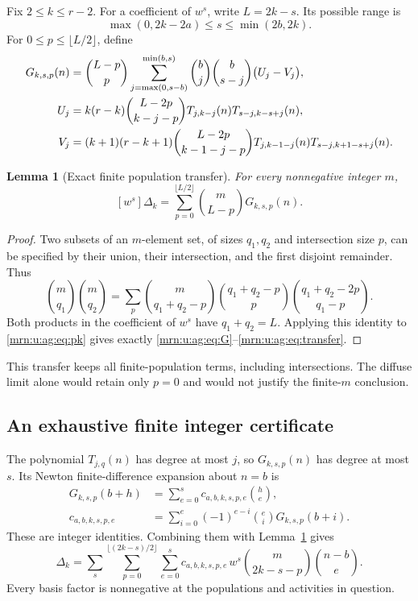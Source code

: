 \documentclass[11pt,a4paper]{article}
\newtheorem{lemma}[theorem]{Lemma}
\theoremstyle{remark}\newtheorem{remark}[theorem]{Remark}
\begin{document}
Fix $2\le k\le r-2$. For a coefficient of $w^s$, write $L=2k-s$. Its possible range is
\begin{equation}\label{mrn:u:ag:eq:srange}
 \max(0,2k-2a)\le s\le\min(2b,2k).
\end{equation}
For $0\le p\le\lfloor L/2\rfloor$, define
\begin{align}
 G_{k,s,p}(n)
 &=\binom{L-p}{p}
   \sum_{j=\max(0,s-b)}^{\min(b,s)}
       \binom bj\binom b{s-j}\bigl(U_j-V_j\bigr),\label{mrn:u:ag:eq:G}\\
 U_j&=k(r-k)\binom{L-2p}{k-j-p}
       T_{j,k-j}(n)T_{s-j,k-s+j}(n),\notag\\
 V_j&=(k+1)(r-k+1)\binom{L-2p}{k-1-j-p}
       T_{j,k-1-j}(n)T_{s-j,k+1-s+j}(n).\notag
\end{align}

\begin{lemma}[Exact finite population transfer]\label{mrn:u:ag:lem:transfer}
For every nonnegative integer $m$,
\begin{equation}\label{mrn:u:ag:eq:transfer}
 [w^s]\Delta_k=\sum_{p=0}^{\lfloor L/2\rfloor}
                  \binom m{L-p}G_{k,s,p}(n).
\end{equation}
\end{lemma}
\begin{proof}
Two subsets of an $m$-element set, of sizes $q_1,q_2$ and intersection size $p$, can be specified by their union, their intersection, and the first disjoint remainder. Thus
\[
 \binom m{q_1}\binom m{q_2}
 =\sum_p\binom m{q_1+q_2-p}
          \binom{q_1+q_2-p}{p}
          \binom{q_1+q_2-2p}{q_1-p}.
\]
Both products in the coefficient of $w^s$ have $q_1+q_2=L$. Applying this identity to \eqref{mrn:u:ag:eq:pk} gives exactly \eqref{mrn:u:ag:eq:G}--\eqref{mrn:u:ag:eq:transfer}.
\end{proof}

This transfer keeps all finite-population terms, including intersections. The diffuse limit alone would retain only $p=0$ and would not justify the finite-$m$ conclusion.

\subsection{An exhaustive finite integer certificate}
The polynomial $T_{j,q}(n)$ has degree at most $j$, so $G_{k,s,p}(n)$ has degree at most $s$. Its Newton finite-difference expansion about $n=b$ is
\begin{align}
 G_{k,s,p}(b+h)
 &=\sum_{e=0}^{s}c_{a,b,k,s,p,e}\binom he,\label{mrn:u:ag:eq:difference}\\
 c_{a,b,k,s,p,e}
 &=\sum_{i=0}^{e}(-1)^{e-i}\binom ei G_{k,s,p}(b+i).\label{mrn:u:ag:eq:c}
\end{align}
These are integer identities. Combining them with Lemma~\ref{mrn:u:ag:lem:transfer} gives
\begin{equation}\label{mrn:u:ag:eq:certificate}
 \Delta_k=
 \sum_s\sum_{p=0}^{\lfloor(2k-s)/2\rfloor}\sum_{e=0}^{s}
 c_{a,b,k,s,p,e}\,
 w^s\binom m{2k-s-p}\binom{n-b}{e}.
\end{equation}
Every basis factor is nonnegative at the populations and activities in question.
\end{document}
